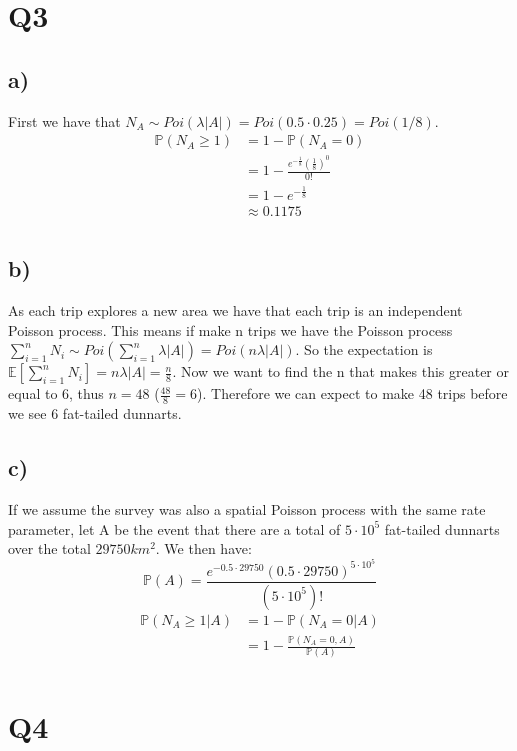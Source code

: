\documentclass{article}
\begin{document}
\section*{Q3}
\subsection*{a)}
First we have that $N_A\sim Poi(\lambda|A|)=Poi(0.5\cdot0.25)=Poi(1/8)$.
\begin{align*}
\mathbb{P}(N_A\geq1)&=1-\mathbb{P}(N_A=0)\\
&=1-\frac{e^{-\frac{1}{8}}\left(\frac{1}{8}\right)^0}{0!}\\
&=1-e^{-\frac{1}{8}}\\
&\approx 0.1175\\
\end{align*}
\subsection*{b)}
As each trip explores a new area we have that each trip is an independent Poisson process. This means if make n trips we have the Poisson process $\sum_{i=1}^{n}N_{i}\sim Poi(\sum_{i=1}^{n}\lambda|A|)=Poi(n\lambda|A|)$. So the expectation is $\mathbb{E}[\sum_{i=1}^{n}N_{i}]=n\lambda|A|=\frac{n}{8}$. Now we want to find the n that makes this greater or equal to 6, thus $n=48$ ($\frac{48}{8}=6$). Therefore we can expect to make 48 trips before we see 6 fat-tailed dunnarts. 
\subsection*{c)}
If we assume the survey was also a spatial Poisson process with the same rate parameter, let A be the event that there are a total of $5\cdot10^5$ fat-tailed dunnarts over the total $29750km^2$. We then have:
$$\mathbb{P}(A)=\frac{e^{-0.5\cdot29750}(0.5\cdot29750)^{5\cdot10^5}}{(5\cdot10^5)!}$$
\begin{align*}
\mathbb{P}(N_{A}\geq1|A)&=1-\mathbb{P}(N_{A}=0|A)\\
&=1-\frac{\mathbb{P}(N_{A}=0,A)}{\mathbb{P}(A)}\\
\end{align*}
\section*{Q4}
\end{document}
